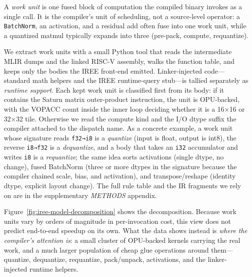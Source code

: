 A \emph{work unit} is one fused block of computation the compiled binary invokes as a single call. It is the compiler's unit of scheduling, not a source-level operator: a \texttt{BatchNorm}, an activation, and a residual add often fuse into one work unit, while a quantized matmul typically expands into three (pre-pack, compute, requantize).

We extract work units with a small Python tool that reads the intermediate MLIR dumps and the linked RISC-V assembly, walks the function table, and keeps only the bodies the IREE front-end emitted. Linker-injected code---standard math helpers and the IREE runtime-query stub---is tallied separately as \emph{runtime support}. Each kept work unit is classified first from its body: if it contains the Saturn matrix outer-product instruction, the unit is OPU-backed, with the VOPACC count inside the inner loop deciding whether it is a 16$\times$16 or 32$\times$32 tile. Otherwise we read the compute kind and the I/O dtype suffix the compiler attached to the dispatch name. As a concrete example, a work unit whose signature reads \texttt{f32→i8} is a \emph{quantize} (input is float, output is int8), the reverse \texttt{i8→f32} is a \emph{dequantize}, and a body that takes an \texttt{i32} accumulator and writes \texttt{i8} is a \emph{requantize}; the same idea sorts activations (single dtype, no change), fused BatchNorm (three or more dtypes in the signature because the compiler chained scale, bias, and activation), and transpose/reshape (identity dtype, explicit layout change). The full rule table and the IR fragments we rely on are in the supplementary \emph{METHODS} appendix.

Figure~\ref{fig:iree-model-decomposition} shows the decomposition. Because work units vary by orders of magnitude in per-invocation cost, this view does not predict end-to-end speedup on its own. What the data shows instead is \emph{where the compiler's attention is}: a small cluster of OPU-backed kernels carrying the real work, and a much larger population of cheap glue operations around them---quantize, dequantize, requantize, pack/unpack, activations, and the linker-injected runtime helpers.

